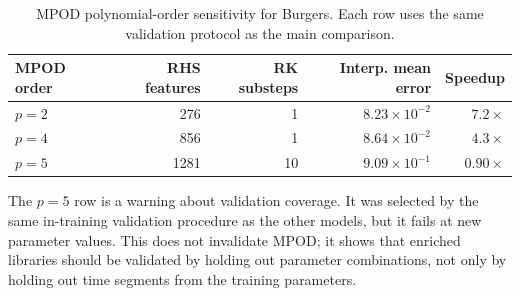 \documentclass[11pt]{article}
\begin{document}
\begin{table}[!htbp]
\centering
\caption{MPOD polynomial-order sensitivity for Burgers.  Each row uses the same
validation protocol as the main comparison.}
\label{tab:mpod_audit}
\begin{tabular}{lrrrr}
\toprule
MPOD order & RHS features & RK substeps & Interp. mean error & Speedup\\
\midrule
$p=2$ & 276 & 1 & $8.23\times10^{-2}$ & $7.2\times$\\
$p=4$ & 856 & 1 & $8.64\times10^{-2}$ & $4.3\times$\\
$p=5$ & 1281 & 10 & $9.09\times10^{-1}$ & $0.90\times$\\
\bottomrule
\end{tabular}
\end{table}

The $p=5$ row is a warning about validation coverage.  It was selected by the
same in-training validation procedure as the other models, but it fails at new
parameter values.  This does not invalidate MPOD; it shows that enriched
libraries should be validated by holding out parameter combinations, not only
by holding out time segments from the training parameters.
\end{document}
